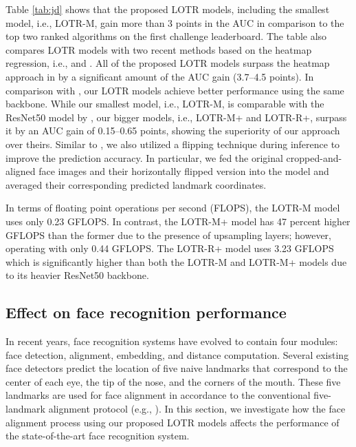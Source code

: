 \documentclass[journal]{IEEEtran}
\begin{document}
Table \ref{tab:jd} shows that the proposed LOTR models, including the smallest model, i.e., LOTR-M, gain more than 3 points in the AUC in comparison to the top two ranked algorithms on the first challenge leaderboard.
The table also compares LOTR models with two recent methods based on the heatmap regression, i.e., \cite{earp2021sub} and \cite{xiong2020}. 
All of the proposed LOTR models surpass the heatmap approach in \cite{xiong2020} by a significant amount of the AUC gain (3.7--4.5 points). 
In comparison with \cite{earp2021sub}, our LOTR models achieve better performance using the same backbone. 
While our smallest model, i.e., LOTR-M, is comparable with the ResNet50 model by \cite{earp2021sub}, our bigger models, i.e., LOTR-M+ and LOTR-R+, surpass it by an AUC gain of 0.15--0.65 points, showing the superiority of our approach over theirs.
Similar to \cite{earp2021sub}, we also utilized a flipping technique during inference to improve the prediction accuracy. 
In particular, we fed the original cropped-and-aligned face images and their horizontally flipped version into the model and averaged their corresponding predicted landmark coordinates.

In terms of floating point operations per second  (FLOPS), the LOTR-M model uses only 0.23 GFLOPS. 
In contrast, the LOTR-M+ model has 47 percent higher GFLOPS than the former due to the presence of upsampling layers; however, operating with only 0.44 GFLOPS. 
The LOTR-R+ model uses 3.23 GFLOPS which is significantly higher than both the LOTR-M and LOTR-M+ models due to its heavier ResNet50 backbone.



\subsection{Effect on face recognition performance}\label{subsec:face_rec}
In recent years, face recognition systems have evolved to contain four modules: face detection, alignment, embedding, and distance computation.
Several existing face detectors predict the location of five naive landmarks that correspond to the center of each eye, the tip of the nose, and the corners of the mouth.
These five landmarks are used for face alignment in accordance to the conventional five-landmark alignment protocol (e.g., \cite{wolf2009,schroff2015,LiuWeiyang2017,wang2018,deng2018,an2020}).
In this section, we investigate how the face alignment process using our proposed LOTR models affects the performance of the state-of-the-art face recognition system.
\end{document}
